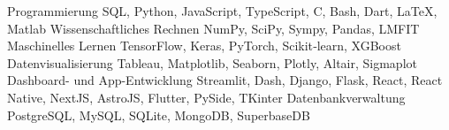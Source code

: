 
\begin{cvskills}

\cvskill
{Programmierung}
{SQL, Python, JavaScript, TypeScript, C, Bash, Dart, LaTeX, Matlab}
\cvskill
{Wissenschaftliches Rechnen}
{NumPy, SciPy, Sympy, Pandas, LMFIT}
\cvskill
{Maschinelles Lernen}
{TensorFlow, Keras, PyTorch, Scikit‑learn, XGBoost}
\cvskill
{Datenvisualisierung}
{Tableau, Matplotlib, Seaborn, Plotly, Altair, Sigmaplot}
\cvskill
{Dashboard- und App-Entwicklung}
{Streamlit, Dash, Django, Flask, React, React Native, NextJS, AstroJS, Flutter, PySide, TKinter}
\cvskill
{Datenbankverwaltung}
{PostgreSQL, MySQL, SQLite, MongoDB, SuperbaseDB}
\end{cvskills}